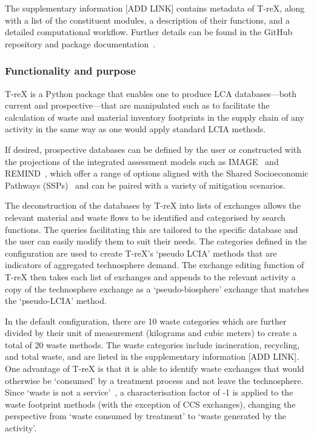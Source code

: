 The supplementary information [ADD LINK] contains metadata of T-reX, along with a list of the constituent modules, a description of their functions, and a detailed computational workflow. Further details can be found in the GitHub repository and package documentation~\citep{mcdowall2024T-reXgithub, mcdowall2023T-reXdocs}.

\subsubsection{Functionality and purpose}

T-reX is a Python package that enables one to produce LCA databases---both current and prospective---that are manipulated such as to facilitate the calculation of waste and material inventory footprints in the supply chain of any activity in the same way as one would apply standard LCIA methods. 

If desired, prospective databases can be defined by the user or constructed with the projections of the integrated assessment models such as IMAGE~\citep{stehfest2014image} and REMIND~\citep{remind2020model}, which offer a range of options aligned with the Shared Socioeconomic Pathways (SSPs)~\citep{ssp2020ghg} and can be paired with a variety of mitigation scenarios.

The deconstruction of the databases by T-reX into lists of exchanges allows the relevant material and waste flows to be identified and categorised by search functions. The queries facilitating this are tailored to the specific database and the user can easily modify them to suit their needs. The categories defined in the configuration are used to create T-reX's `pseudo LCIA' methods that are indicators of aggregated technosphere demand. The exchange editing function of T-reX then takes each list of exchanges and appends to the relevant activity a copy of the technosphere exchange as a `pseudo-biosphere' exchange that matches the `pseudo-LCIA' method.

In the default configuration, there are 10 waste categories which are further divided by their unit of measurement (kilograms and cubic meters) to create a total of 20 waste methods. The waste categories include incineration, recycling, and total waste, and are listed in the supplementary information [ADD LINK]. One advantage of T-reX is that it is able to identify waste exchanges that would otherwise be `consumed' by a treatment process and not leave the technosphere. Since `waste is not a service'~\citep{guinee2021wasteisnotaservice}, a characterisation factor of -1 is applied to the waste footprint methods (with the exception of CCS exchanges), changing the perspective from `waste consumed by treatment' to `waste generated by the activity'.

